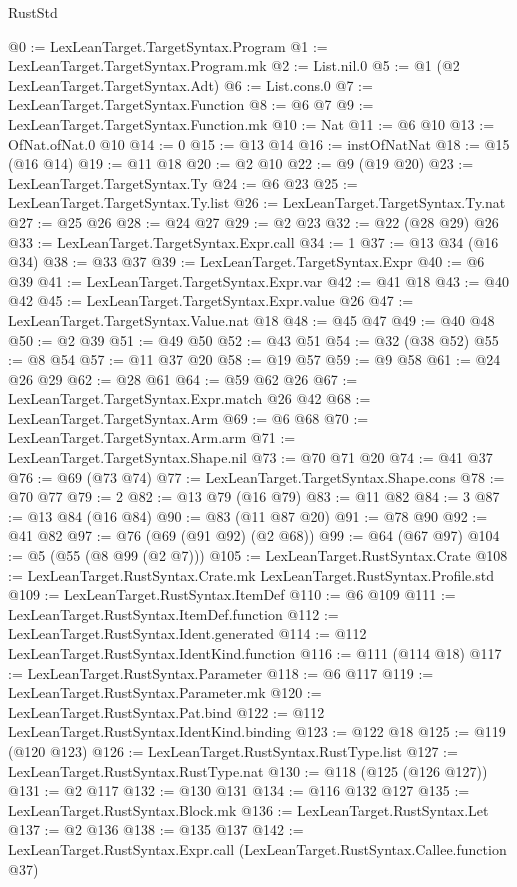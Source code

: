 \begin{lexlean}{RustStd}
\begin{coremodule}
@0 := LexLeanTarget.TargetSyntax.Program
@1 := LexLeanTarget.TargetSyntax.Program.mk
@2 := List.nil.{0}
@5 := @1 (@2 LexLeanTarget.TargetSyntax.Adt)
@6 := List.cons.{0}
@7 := LexLeanTarget.TargetSyntax.Function
@8 := @6 @7
@9 := LexLeanTarget.TargetSyntax.Function.mk
@10 := Nat
@11 := @6 @10
@13 := OfNat.ofNat.{0} @10
@14 := 0
@15 := @13 @14
@16 := instOfNatNat
@18 := @15 (@16 @14)
@19 := @11 @18
@20 := @2 @10
@22 := @9 (@19 @20)
@23 := LexLeanTarget.TargetSyntax.Ty
@24 := @6 @23
@25 := LexLeanTarget.TargetSyntax.Ty.list
@26 := LexLeanTarget.TargetSyntax.Ty.nat
@27 := @25 @26
@28 := @24 @27
@29 := @2 @23
@32 := @22 (@28 @29) @26
@33 := LexLeanTarget.TargetSyntax.Expr.call
@34 := 1
@37 := @13 @34 (@16 @34)
@38 := @33 @37
@39 := LexLeanTarget.TargetSyntax.Expr
@40 := @6 @39
@41 := LexLeanTarget.TargetSyntax.Expr.var
@42 := @41 @18
@43 := @40 @42
@45 := LexLeanTarget.TargetSyntax.Expr.value @26
@47 := LexLeanTarget.TargetSyntax.Value.nat @18
@48 := @45 @47
@49 := @40 @48
@50 := @2 @39
@51 := @49 @50
@52 := @43 @51
@54 := @32 (@38 @52)
@55 := @8 @54
@57 := @11 @37 @20
@58 := @19 @57
@59 := @9 @58
@61 := @24 @26 @29
@62 := @28 @61
@64 := @59 @62 @26
@67 := LexLeanTarget.TargetSyntax.Expr.match @26 @42
@68 := LexLeanTarget.TargetSyntax.Arm
@69 := @6 @68
@70 := LexLeanTarget.TargetSyntax.Arm.arm
@71 := LexLeanTarget.TargetSyntax.Shape.nil
@73 := @70 @71 @20
@74 := @41 @37
@76 := @69 (@73 @74)
@77 := LexLeanTarget.TargetSyntax.Shape.cons
@78 := @70 @77
@79 := 2
@82 := @13 @79 (@16 @79)
@83 := @11 @82
@84 := 3
@87 := @13 @84 (@16 @84)
@90 := @83 (@11 @87 @20)
@91 := @78 @90
@92 := @41 @82
@97 := @76 (@69 (@91 @92) (@2 @68))
@99 := @64 (@67 @97)
@104 := @5 (@55 (@8 @99 (@2 @7)))
@105 := LexLeanTarget.RustSyntax.Crate
@108 := LexLeanTarget.RustSyntax.Crate.mk LexLeanTarget.RustSyntax.Profile.std
@109 := LexLeanTarget.RustSyntax.ItemDef
@110 := @6 @109
@111 := LexLeanTarget.RustSyntax.ItemDef.function
@112 := LexLeanTarget.RustSyntax.Ident.generated
@114 := @112 LexLeanTarget.RustSyntax.IdentKind.function
@116 := @111 (@114 @18)
@117 := LexLeanTarget.RustSyntax.Parameter
@118 := @6 @117
@119 := LexLeanTarget.RustSyntax.Parameter.mk
@120 := LexLeanTarget.RustSyntax.Pat.bind
@122 := @112 LexLeanTarget.RustSyntax.IdentKind.binding
@123 := @122 @18
@125 := @119 (@120 @123)
@126 := LexLeanTarget.RustSyntax.RustType.list
@127 := LexLeanTarget.RustSyntax.RustType.nat
@130 := @118 (@125 (@126 @127))
@131 := @2 @117
@132 := @130 @131
@134 := @116 @132 @127
@135 := LexLeanTarget.RustSyntax.Block.mk
@136 := LexLeanTarget.RustSyntax.Let
@137 := @2 @136
@138 := @135 @137
@142 := LexLeanTarget.RustSyntax.Expr.call (LexLeanTarget.RustSyntax.Callee.function @37)

\end{coremodule}
\end{lexlean}
